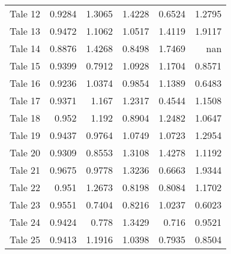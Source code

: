 \begin{table}[h]
\begin{tabular}{lrrrrr}
 Tale 12 &                        0.9284 &                      1.3065 &                        1.4228 &                          0.6524 &                         1.2795 \\
 Tale 13 &                        0.9472 &                      1.1062 &                        1.0517 &                          1.4119 &                         1.9117 \\
 Tale 14 &                        0.8876 &                      1.4268 &                        0.8498 &                          1.7469 &                       nan      \\
 Tale 15 &                        0.9399 &                      0.7912 &                        1.0928 &                          1.1704 &                         0.8571 \\
 Tale 16 &                        0.9236 &                      1.0374 &                        0.9854 &                          1.1389 &                         0.6483 \\
 Tale 17 &                        0.9371 &                      1.167  &                        1.2317 &                          0.4544 &                         1.1508 \\
 Tale 18 &                        0.952  &                      1.192  &                        0.8904 &                          1.2482 &                         1.0647 \\
 Tale 19 &                        0.9437 &                      0.9764 &                        1.0749 &                          1.0723 &                         1.2954 \\
 Tale 20 &                        0.9309 &                      0.8553 &                        1.3108 &                          1.4278 &                         1.1192 \\
 Tale 21 &                        0.9675 &                      0.9778 &                        1.3236 &                          0.6663 &                         1.9344 \\
 Tale 22 &                        0.951  &                      1.2673 &                        0.8198 &                          0.8084 &                         1.1702 \\
 Tale 23 &                        0.9551 &                      0.7404 &                        0.8216 &                          1.0237 &                         0.6023 \\
 Tale 24 &                        0.9424 &                      0.778  &                        1.3429 &                          0.716  &                         0.9521 \\
 Tale 25 &                        0.9413 &                      1.1916 &                        1.0398 &                          0.7935 &                         0.8504 \\
\bottomrule
\end{tabular}
\end{table}